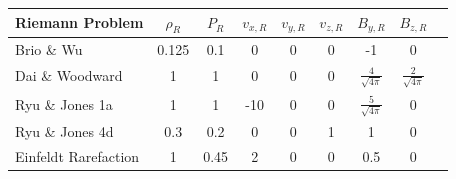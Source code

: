 \documentclass[modern]{aastex631}
\begin{document}
\begin{table}
\begin{tabular}{lcccccccccc}


    \end{tabular}
    \newline
    \newline
    \newline
    \begin{tabular}{lcccccccc}





        Riemann Problem & $\rho_R$ & $P_R$ & $v_{x,R}$ & $v_{y,R}$ & $v_{z,R}$ & $B_{y,R}$ & $B_{z,R}$ \\ \hline

        Brio \& Wu           & 0.125 & 0.1  & 0     & 0   & 0   & -1                      & 0                       \\ \hline
        Dai \& Woodward      & 1     & 1    & 0     & 0   & 0   & $\frac{4}{\sqrt{4\pi}}$ & $\frac{2}{\sqrt{4\pi}}$ \\ \hline
        Ryu \& Jones 1a      & 1     & 1    & -10   & 0   & 0   & $\frac{5}{\sqrt{4\pi}}$ & 0                       \\ \hline
        Ryu \& Jones 4d      & 0.3   & 0.2  & 0     & 0   & 1   & 1                       & 0                       \\ \hline
        Einfeldt Rarefaction & 1     & 0.45 & 2     & 0   & 0   & 0.5                     & 0                       \\ \hline


\end{tabular}
\end{table}
\end{document}
